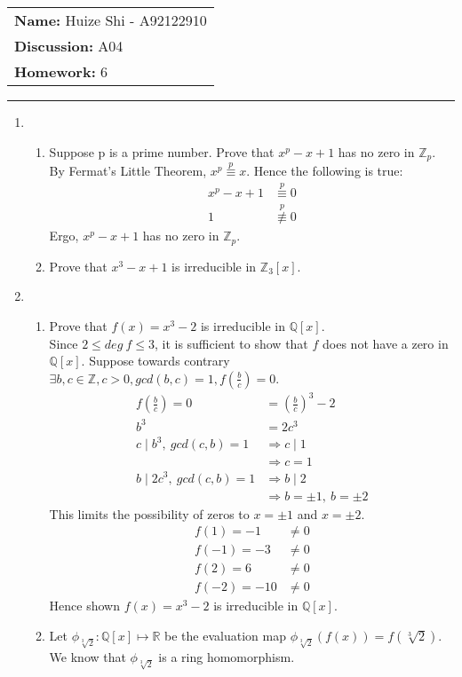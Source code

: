 \documentclass[12pt]{article}
\begin{document}
\null\hfill\begin{tabular}[t]{l@{}}
	\textbf{Name: }Huize Shi - A92122910 \\
	\textbf{Discussion: }A04 \\
	\textbf{Homework: }6
\end{tabular}
\noindent\rule{\textwidth}{0.5pt}

\begin{enumerate}
	\item
		\begin{enumerate}
			\item Suppose p is a prime number. Prove that $x^p -x + 1$ has no zero in
				$\mathbb{Z}_p$.\\
				By Fermat's Little Theorem, $x^p \overset{p}{\equiv} x$. Hence the
				following is true:
				\begin{align*}
					x^p - x + 1 &\overset{p}{\equiv} 0\\
					1 &\overset{p}{\not\equiv} 0
				\end{align*}
				Ergo, $x^p -x + 1$ has no zero in $\mathbb{Z}_p$.

			\item Prove that $x^3 - x + 1$ is irreducible in $\mathbb{Z}_3[x]$.

		\end{enumerate}

	\item
		\begin{enumerate}
			\item Prove that $f(x)=x^3 - 2$ is irreducible in $\mathbb{Q}[x]$.\\
				Since $2 \le deg\ f \le 3$, it is sufficient to show that $f$ does not
				have a zero in $\mathbb{Q}[x]$. Suppose towards contrary $\exists b, c
				\in \mathbb{Z}, c > 0, gcd(b,c)=1, f(\frac{b}{c})=0$.
				\begin{align*}
					f\left(\frac{b}{c}\right) = 0 &= \left(\frac{b}{c}\right)^3 - 2\\
						b^3 &= 2c^3\\
						c \mid b^3,\ gcd(c,b) = 1 &\Rightarrow c \mid 1 \\
						&\Rightarrow c = 1\\
						b \mid 2c^3,\ gcd(c,b) = 1 &\Rightarrow b \mid 2 \\
						&\Rightarrow b = \pm 1,\ b = \pm 2
				\end{align*}
				This limits the possibility of zeros to $x= \pm 1$ and $x= \pm 2$.
				\begin{align*}
				f(1) = -1 &\neq 0\\
				f(-1) = -3 &\neq 0\\
				f(2) = 6 &\neq 0\\
				f(-2) = -10 &\neq 0
				\end{align*}
				Hence shown $f(x)=x^3 - 2$ is irreducible in $\mathbb{Q}[x]$.
			\item Let $\phi_{\sqrt[3]{2}} : \mathbb{Q}[x] \mapsto \mathbb{R}$ be the
				evaluation map $\phi_{\sqrt[3]{2}}(f(x))=f(\sqrt[3]{2})$. We know that
				$\phi_{\sqrt[3]{2}}$ is a ring homomorphism.

\end{enumerate}
\end{enumerate}
\end{document}
